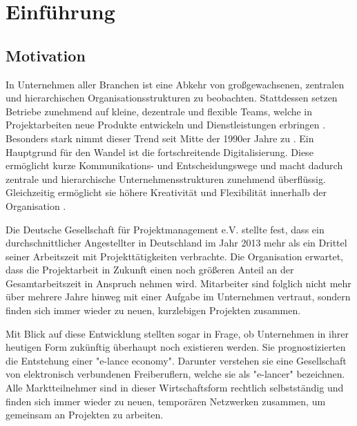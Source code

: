 \chapter{Einführung}
\label{ch:intro}

\section{Motivation}
\label{sec:intro:motivation}
In Unternehmen aller Branchen ist eine Abkehr von großgewachsenen, zentralen und hierarchischen Organisationsstrukturen zu beobachten. Stattdessen setzen Betriebe zunehmend auf kleine, dezentrale und flexible Teams, welche in Projektarbeiten neue Produkte entwickeln und Dienstleistungen erbringen \cite[S. 3]{elanceEconomy:1999}. Besonders stark nimmt dieser Trend seit Mitte der 1990er Jahre zu \cite[S. 8]{whittington:1999}. Ein Hauptgrund für den Wandel ist die fortschreitende Digitalisierung. Diese ermöglicht kurze Kommunikations- und Entscheidungswege und macht dadurch zentrale und hierarchische Unternehmensstrukturen zunehmend überflüssig. Gleichzeitig ermöglicht sie höhere Kreativität und Flexibilität innerhalb der Organisation \cite[S. 5]{elanceEconomy:1999}.

Die Deutsche Gesellschaft für Projektmanagement e.V. \cite[S. 16]{gpm:2015} stellte fest, dass ein durchschnittlicher Angestellter in Deutschland im Jahr 2013 mehr als ein Drittel seiner Arbeitszeit mit Projekttätigkeiten verbrachte. Die Organisation erwartet, dass die Projektarbeit in Zukunft einen noch größeren Anteil an der Gesamtarbeitszeit in Anspruch nehmen wird. Mitarbeiter sind folglich nicht mehr über mehrere Jahre hinweg mit einer Aufgabe im Unternehmen vertraut, sondern finden sich immer wieder zu neuen, kurzlebigen Projekten zusammen.

Mit Blick auf diese Entwicklung stellten \textcite[S. 2ff.]{elanceEconomy:1999} sogar in Frage, ob Unternehmen in ihrer heutigen Form zukünftig überhaupt noch existieren werden. Sie prognostizierten die Entstehung einer "e-lance economy". Darunter verstehen sie eine Gesellschaft von elektronisch verbundenen Freiberuflern, welche sie als "e-lancer" bezeichnen. Alle Marktteilnehmer sind in dieser Wirtschaftsform rechtlich selbstständig und finden sich immer wieder zu neuen, temporären Netzwerken zusammen, um gemeinsam an Projekten zu arbeiten.

